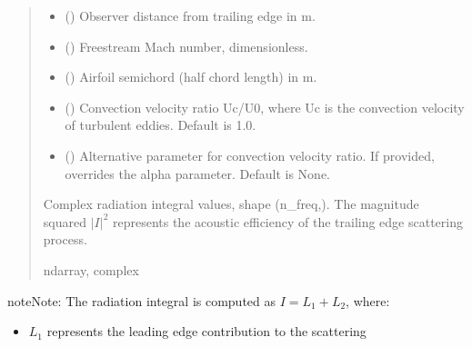 \documentclass[letterpaper,10pt,english]{sphinxmanual}
\begin{document}
\begin{fulllineitems}
\begin{quote}
\begin{description}
\begin{itemize}
\item {} 
\sphinxAtStartPar
{} () \textendash{} Observer distance from trailing edge in m.

\item {} 
\sphinxAtStartPar
{} () \textendash{} Free\sphinxhyphen{}stream Mach number, dimensionless.

\item {} 
\sphinxAtStartPar
{} () \textendash{} Airfoil semi\sphinxhyphen{}chord (half chord length) in m.

\item {} 
\sphinxAtStartPar
{} (\sphinxstyleliteralemphasis{\sphinxupquote{, }}) \textendash{} Convection velocity ratio Uc/U0, where Uc is the convection
velocity of turbulent eddies. Default is 1.0.

\item {} 
\sphinxAtStartPar
{} (\sphinxstyleliteralemphasis{\sphinxupquote{, }}) \textendash{} Alternative parameter for convection velocity ratio. If provided,
overrides the alpha parameter. Default is None.

\end{itemize}

\sphinxAtStartPar
{} \textendash{} Complex radiation integral values, shape (n\_freq,).
The magnitude squared \(\vert I\vert^2\) represents the acoustic efficiency
of the trailing edge scattering process.

\sphinxAtStartPar
ndarray, complex

\end{description}\end{quote}

\begin{sphinxadmonition}{note}{Note:}
\sphinxAtStartPar
The radiation integral is computed as \(I = L_1 + L_2\), where:
\begin{itemize}
\item {} 
\sphinxAtStartPar
\(L_1\) represents the leading edge contribution to the scattering


\end{itemize}
\end{sphinxadmonition}
\end{fulllineitems}
\end{document}
